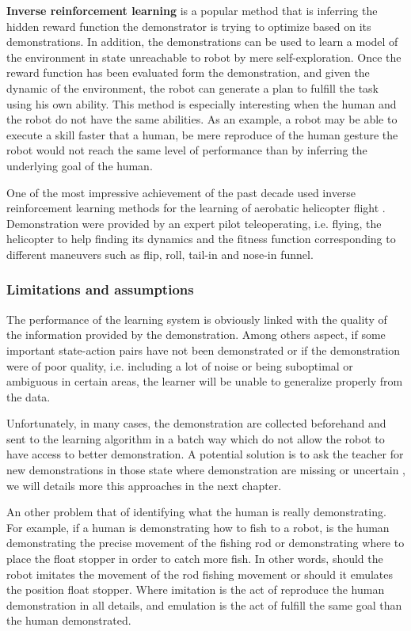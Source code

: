 \textbf{Inverse reinforcement learning} \cite{ng2000algorithms,Abbeel04icml} is a popular method that is inferring the hidden reward function the demonstrator is trying to optimize based on its demonstrations. In addition, the demonstrations can be used to learn a model of the environment in state unreachable to robot by mere self-exploration. Once the reward function has been evaluated form the demonstration, and given the dynamic of the environment, the robot can generate a plan to fulfill the task using his own ability. This method is especially interesting when the human and the robot do not have the same abilities. As an example, a robot may be able to execute a skill faster that a human, be mere reproduce of the human gesture the robot would not reach the same level of performance than by inferring the underlying goal of the human.

One of the most impressive achievement of the past decade used inverse reinforcement learning methods for the learning of aerobatic helicopter flight \cite{abbeel2007application}. Demonstration were provided by an expert pilot teleoperating, i.e. flying, the helicopter to help finding its dynamics and the fitness function corresponding to different maneuvers such as flip, roll, tail-in and nose-in funnel.

\subsubsection*{Limitations and assumptions}

The performance of the learning system is obviously linked with the quality of the information provided by the demonstration. Among others aspect, if some important state-action pairs have not been demonstrated or if the demonstration were of poor quality, i.e. including a lot of noise or being suboptimal or ambiguous in certain areas, the learner will be unable to generalize properly from the data. 

Unfortunately, in many cases, the demonstration are collected beforehand and sent to the learning algorithm in a batch way which do not allow the robot to have access to better demonstration. A potential solution is to ask the teacher for new demonstrations in those state where demonstration are missing or uncertain \cite{chernova2008multi,chernova09jair}, we will details more this approaches in the next chapter.

An other problem that of identifying what the human is really demonstrating. For example, if a human is demonstrating how to fish to a robot, is the human demonstrating the precise movement of the fishing rod or demonstrating where to place the float stopper in order to catch more fish. In other words, should the robot imitates the movement of the rod fishing movement or should it emulates the position float stopper. Where imitation is the act of reproduce the human demonstration in all details, and emulation is the act of fulfill the same goal than the human demonstrated. 

